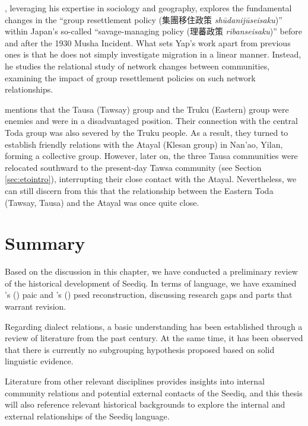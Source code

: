 \textcite{yap2023}, leveraging his expertise in sociology and geography, explores the fundamental changes in the ``group resettlement policy (集團移住政策 \textit{shūdanijūseisaku})'' within Japan's so-called ``savage-managing policy (理蕃政策 \textit{ribanseisaku})'' before and after the 1930 Musha Incident. What sets Yap's work apart from previous ones is that he does not simply investigate migration in a linear manner. Instead, he studies the relational study of network changes between communities, examining the impact of group resettlement policies on such network relationships.

\textcite[137,153]{yap2023} mentions that the Tausa (Tawsay) group and the Truku (Eastern) group were enemies and were in a disadvantaged position. Their connection with the central Toda group was also severed by the Truku people. As a result, they turned to establish friendly relations with the Atayal (Klesan group) in Nan'ao, Yilan, forming a collective group. However, later on, the three Tausa communities were relocated southward to the present-day Tawsa community (see Section \ref{sec:etointro}), interrupting their close contact with the Atayal. Nevertheless, we can still discern from this that the relationship between the Eastern Toda (Tawsay, Tausa) and the Atayal was once quite close.

\section{Summary} \label{sec:ch2_sum}

Based on the discussion in this chapter, we have conducted a preliminary review of the historical development of Seediq. In terms of language, we have examined \citeauthor{li1981paic}'s (\citeyear{li1981paic}) \acl{paic} and \citeauthor{ochiai2016buhwan}'s (\citeyear{ochiai2016buhwan}) \acl{psed} reconstruction, discussing research gaps and parts that warrant revision. 

Regarding dialect relations, a basic understanding has been established through a review of literature from the past century. At the same time, it has been observed that there is currently no subgrouping hypothesis proposed based on solid linguistic evidence.

Literature from other relevant disciplines provides insights into internal community relations and potential external contacts of the Seediq, and this thesis will also reference relevant historical backgrounds to explore the internal and external relationships of the Seediq language.
